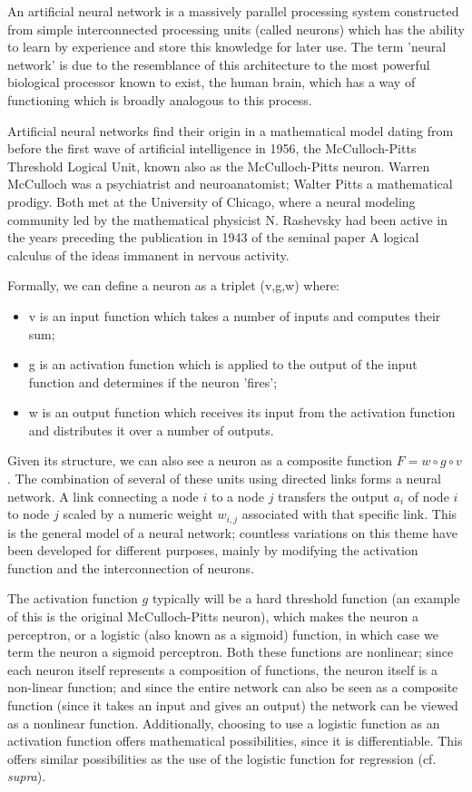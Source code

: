 An artificial neural network is a massively parallel processing system
constructed from simple interconnected processing units (called
neurons) which has the ability to learn by experience and store this
knowledge for later use. The term 'neural network' is due to the
resemblance of this architecture to the most powerful biological
processor known to exist, the human brain, which has a way of
functioning which is broadly analogous to this process. 

Artificial neural networks find their origin in a mathematical model
dating from before the first wave of artificial intelligence in 1956,
the McCulloch-Pitts Threshold Logical Unit, known also as the
McCulloch-Pitts neuron. Warren McCulloch was a psychiatrist and
neuroanatomist; Walter Pitts a mathematical prodigy. Both met at the
University of Chicago, where a neural modeling community led by the
mathematical physicist N. Rashevsky had been active in the years
preceding the publication in 1943 of the seminal paper A logical
calculus of the ideas immanent in nervous activity. 

Formally, we can define a neuron as a triplet (v,g,w) where:

\begin{itemize}
\item v is an input function which takes a number of inputs and computes their sum;
\item g is an activation function which is applied to the output of the input function and determines if the neuron 'fires';
\item w is an output function which receives its input from the activation
  function and distributes it over a number of outputs.
\end{itemize}

Given its structure, we can also see a neuron as a composite function
$F = w \circ g \circ v$. The combination of several of these units
using directed links forms a neural network. A link connecting a node
$i$ to a node $j$ transfers the output $a_i$ of node $i$ to node $j$
scaled by a numeric weight $w_{i,j}$ associated with that specific
link. This is the general model of a neural network; countless
variations on this theme have been developed for different purposes,
mainly by modifying the activation function and the interconnection of
neurons.

The activation function $g$ typically will be a hard threshold
function (an example of this is the original McCulloch-Pitts neuron),
which makes the neuron a perceptron, or a logistic (also known as a
sigmoid) function, in which case we term the neuron a sigmoid
perceptron. Both these functions are nonlinear; since each neuron
itself represents a composition of functions, the neuron itself is a
non-linear function; and since the entire network can also be seen as
a composite function (since it takes an input and gives an output) the
network can be viewed as a nonlinear function. Additionally, choosing
to use a logistic function as an activation function offers
mathematical possibilities, since it is differentiable. This offers
similar possibilities as the use of the logistic function for
regression (cf. \textit{supra}).

